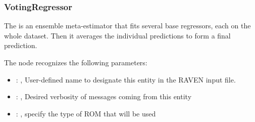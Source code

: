 \subsubsection{VotingRegressor}
  The  is an ensemble meta-estimator that fits several base
  regressors, each on the whole dataset. Then it averages the individual predictions to form
  a final prediction.

  The  node recognizes the following parameters:
    \begin{itemize}
      \item {}: , 
        User-defined name to designate this entity in the RAVEN input file.
      \item {}: , 
        Desired verbosity of messages coming from this entity
      \item {}: , 
        specify the type of ROM that will be used
  \end{itemize}

